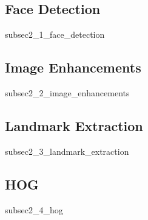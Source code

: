 \subsection{Face Detection}
{subsec2_1_face_detection}

\subsection{Image Enhancements}
{subsec2_2_image_enhancements}

\subsection{Landmark Extraction}
{subsec2_3_landmark_extraction}

\subsection{HOG}
{subsec2_4_hog}
